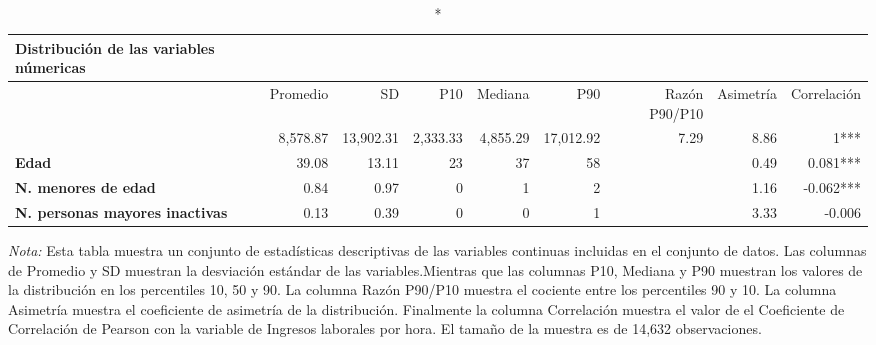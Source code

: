 \centering \footnotesize \setlength{\tabcolsep}{4pt} \renewcommand{\arraystretch}{0.8}
\begingroup
\fontsize{7.0pt}{8.5pt}\selectfont
\begin{longtable}{lrrrrrrrr}
\caption*{
{\large Distribución de las variables númericas}
} \\ 
\toprule
  & Promedio & SD & P10 & Mediana & P90 & Razón P90/P10 & Asimetría & Correlación \\ 
\midrule\addlinespace[2.5pt]
{\bfseries Ingresos laborales por hora} & 8,578.87 & 13,902.31 & 2,333.33 & 4,855.29 & 17,012.92 & 7.29 & 8.86 & 1*** \\ 
{\bfseries Edad} & 39.08 & 13.11 & 23 & 37 & 58 &   & 0.49 & 0.081*** \\ 
{\bfseries N. menores de edad} & 0.84 & 0.97 & 0 & 1 & 2 &   & 1.16 & -0.062*** \\ 
{\bfseries N. personas mayores inactivas} & 0.13 & 0.39 & 0 & 0 & 1 &   & 3.33 & -0.006 \\ 
\bottomrule
\end{longtable}
\endgroup
\begin{minipage}{0.8\textwidth}
                                   \begin{tablenotes}
                                   \item \footnotesize \textit{Nota:} Esta tabla muestra un conjunto de estadísticas descriptivas de las variables continuas incluidas en el conjunto de datos.
                                   Las columnas de Promedio y SD muestran la desviación estándar de las variables.Mientras que las columnas P10, Mediana y P90 muestran los valores de la distribución en los percentiles 10, 50 y 90.
                                   La columna Razón P90/P10 muestra el cociente entre los percentiles 90 y 10.
                                   La columna Asimetría muestra el coeficiente de asimetría de la distribución.
                                   Finalmente la columna Correlación muestra el valor de el Coeficiente de Correlación de Pearson con la variable de Ingresos laborales por hora.
                                   El tamaño de la muestra es de 14,632 observaciones.
                                   \end{tablenotes}
                                   \end{minipage}
